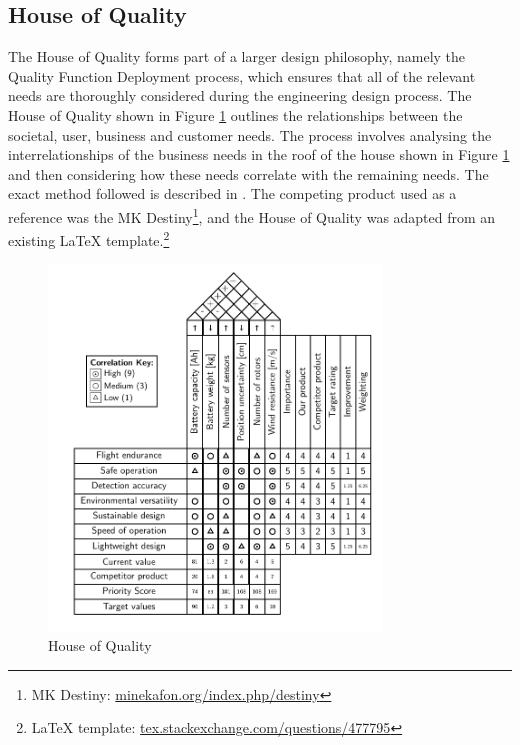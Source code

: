 \subsection{House of Quality}
\label{hoq}

The House of Quality forms part of a larger design philosophy, namely the Quality Function Deployment process, which ensures that all of the relevant needs are thoroughly considered during the engineering design process. The House of Quality shown in Figure \ref{fig:hoq} outlines the relationships between the societal, user, business and customer needs. The process involves analysing the interrelationships of the business needs in the roof of the house shown in Figure \ref{fig:hoq} and then considering how these needs correlate with the remaining needs. The exact method followed is described in \cite{chanqfd}. The competing product used as a reference was the MK Destiny\footnote{MK Destiny: \url{minekafon.org/index.php/destiny}}, and the House of Quality was adapted from an existing {\LaTeX} template.\footnote{{\LaTeX} template: \url{tex.stackexchange.com/questions/477795}}




\begin{figure}[H]
\centering
\includegraphics[width=0.79\textwidth]{figs/Samuel/Figures/test (2).pdf}
\caption{House of Quality}
\label{fig:hoq}
\end{figure}


